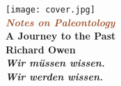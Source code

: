 \documentclass[oneside,12pt,a4paper]{memoir}
\theoremstyle{definition}
\begin{document}
\begin{titlingpage} %
    \centering %
	\setlength{\unitlength}{0.6\textwidth} %
    \parindent=0pt
    \texttt{[image: cover.jpg]} %
    \vfill
	{\color{LightGoldenrod}}\\[\baselineskip] %
	\textcolor{Sienna}{\textit{\Huge \textbf{Notes on Paleontology}}}\\[\baselineskip] %
	{\color{RosyBrown}\Large \textbf{A Journey to the Past}}\\ %
	{\color{LightGoldenrod}} %
	\vfill %
    {\Large\textbf{Richard Owen}}\\ %
    \vfill
    \textbf{\Large\textit{Wir m\"{u}ssen wissen.~\\ Wir werden wissen.}}
    \vfill
    \restoregeometry
\end{titlingpage}


\tableofcontents



\end{document}
